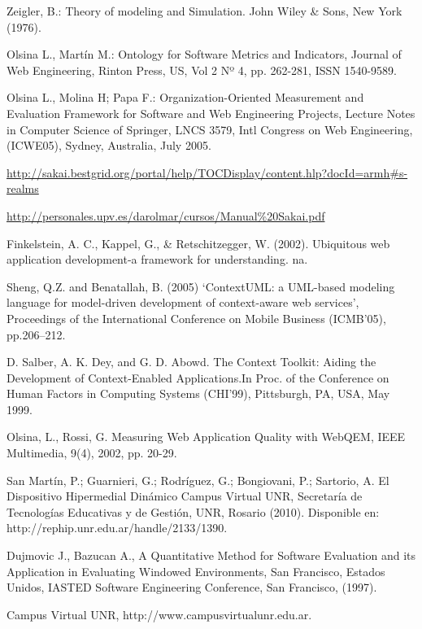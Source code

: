 \begin{thebibliography}{1}
{
Zeigler, B.: Theory of modeling and Simulation. John Wiley & Sons, New York
(1976).

Olsina L., Martín M.: Ontology for Software Metrics and Indicators, Journal of
Web Engineering, Rinton Press, US, Vol 2 Nº 4, pp. 262-281, ISSN 1540-9589.


Olsina L., Molina H; Papa F.: Organization-Oriented Measurement and Evaluation
Framework for Software and Web Engineering Projects, Lecture Notes in Computer
Science of Springer, LNCS 3579, Intl Congress on Web Engineering, (ICWE05),
Sydney, Australia, July 2005.


\url{
http://sakai.bestgrid.org/portal/help/TOCDisplay/content.hlp?docId=armh#s-realms
}


\url{
http://personales.upv.es/darolmar/cursos/Manual\%20Sakai.pdf
}


 Finkelstein, A. C., Kappel, G., & Retschitzegger, W. (2002). Ubiquitous web application development-a framework for understanding. na.


Sheng, Q.Z. and Benatallah, B. (2005) ‘ContextUML: a UML-based modeling
language for model-driven development of context-aware web services’,
Proceedings of the International Conference on Mobile Business (ICMB’05),
pp.206–212.

D. Salber, A. K. Dey, and G. D. Abowd. The Context Toolkit: Aiding the
Development of Context-Enabled Applications.In Proc. of the Conference on Human
Factors in Computing Systems (CHI’99), Pittsburgh, PA, USA, May 1999.


Olsina, L., Rossi, G. Measuring Web Application Quality with WebQEM, IEEE
Multimedia, 9(4), 2002, pp. 20-29.


San Martín, P.; Guarnieri, G.; Rodríguez, G.; Bongiovani, P.; Sartorio, A. El
Dispositivo Hipermedial Dinámico Campus Virtual UNR, Secretaría de Tecnologías
Educativas y de Gestión, UNR, Rosario (2010). Disponible en:
http://rephip.unr.edu.ar/handle/2133/1390.

Dujmovic J., Bazucan A., A Quantitative Method for Software Evaluation and its
Application in Evaluating Windowed Environments, San Francisco, Estados Unidos,
IASTED Software Engineering Conference, San Francisco, (1997).


Campus Virtual UNR, http://www.campusvirtualunr.edu.ar.

}
\end{thebibliography}
